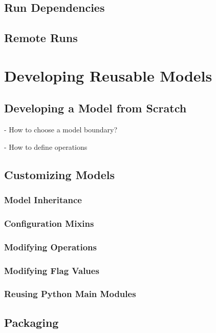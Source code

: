 \documentclass{article}
\begin{document}
\subsection{Run Dependencies}

\subsection{Remote Runs}

\section{Developing Reusable Models}

\subsection{Developing a Model from Scratch}

- How to choose a model boundary?

- How to define operations

\subsection{Customizing Models}

\subsubsection{Model Inheritance}

\subsubsection{Configuration Mixins}

\subsubsection{Modifying Operations}

\subsubsection{Modifying Flag Values}

\subsubsection{Reusing Python Main Modules}

\subsection{Packaging}
\end{document}
